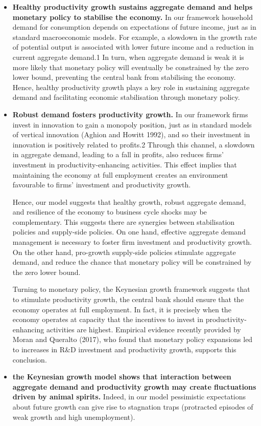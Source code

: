\documentclass[cn,10pt,math=newtx,citestyle=gb7714-2015,bibstyle=gb7714-2015]{elegantbook}
\begin{document}
{{	\begin{itemize}
		\item \textbf{Healthy productivity growth sustains aggregate demand and helps monetary policy to stabilise the economy.} In our framework household demand for consumption depends on expectations of future income, just as in standard macroeconomic models. For example, a slowdown in the growth rate of potential output is associated with lower future income and a reduction in current aggregate demand.1 In turn, when aggregate demand is weak it is more likely that monetary policy will eventually be constrained by the zero lower bound, preventing the central bank from stabilising the economy. Hence, healthy productivity growth plays a key role in sustaining aggregate demand and facilitating economic stabilisation through monetary policy.
		\item \textbf{Robust demand fosters productivity growth.} In our framework firms invest in innovation to gain a monopoly position, just as in standard models of vertical innovation (Aghion and Howitt 1992), and so their investment in innovation is positively related to profits.2 Through this channel, a slowdown in aggregate demand, leading to a fall in profits, also reduces firms’ investment in productivity-enhancing activities. This effect implies that maintaining the economy at full employment creates an environment favourable to firms’ investment and productivity growth. 
		
		Hence, our model suggests that healthy growth, robust aggregate demand, and resilience of the economy to business cycle shocks may be complementary. This suggests there are synergies between stabilisation policies and supply-side policies. On one hand, effective aggregate demand management is necessary to foster firm investment and productivity growth. On the other hand, pro-growth supply-side policies stimulate aggregate demand, and reduce the chance that monetary policy will be constrained by the zero lower bound.
		
		Turning to monetary policy, the Keynesian growth framework suggests that to stimulate productivity growth, the central bank should ensure that the economy operates at full employment. In fact, it is precisely when the economy operates at capacity that the incentives to invest in productivity-enhancing activities are highest. Empirical evidence recently provided by Moran and Queralto (2017), who found that monetary policy expansions led to increases in R\&D investment and productivity growth, supports this conclusion.
		\item \textbf{the Keynesian growth model shows that interaction between aggregate demand and productivity growth may create fluctuations driven by animal spirits.} Indeed, in our model pessimistic expectations about future growth can give rise to stagnation traps (protracted episodes of weak growth and high unemployment).
		

\end{itemize}}}
\end{document}
